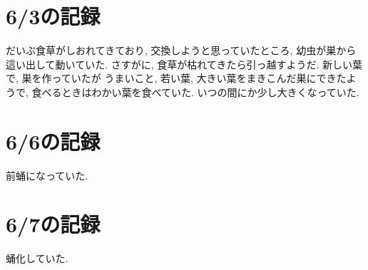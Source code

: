 \documentclass{jsarticle}
\begin{document}
\section{6/3の記録}
だいぶ食草がしおれてきており, 交換しようと思っていたところ, 幼虫が巣から這い出して動いていた. 
さすがに, 食草が枯れてきたら引っ越すようだ. 
新しい葉で, 巣を作っていたが うまいこと, 若い葉, 大きい葉をまきこんだ巣にできたようで, 
食べるときはわかい葉を食べていた. いつの間にか少し大きくなっていた. 

\section{6/6の記録}
前蛹になっていた. 

\section{6/7の記録}
蛹化していた.
\end{document}
